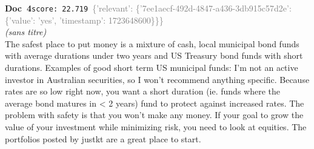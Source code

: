 \documentclass[a4paper,11pt]{article}
\begin{document}
\begin{docenv}
{\footnotesize\textcolor{doccolor}{\textbf{Doc~4}}}\hfill{\tiny\texttt{score:~22.719}}\ {\tiny\textcolor{gray}{\{'relevant': \{'7ee1aecf-492d-4847-a436-3db915c57d2e': \{'value': 'yes', 'timestamp': 1723648600\}\}\}}}\\[3pt]
{\small\textit{(sans titre)}}\\[2pt]
\vspace{2pt}
{\footnotesize 
The safest place to put money is a mixture of cash, local municipal bond funds with average durations under two years and US Treasury bond funds with short durations.  Examples of good short term US municipal funds: I'm not an active investor in Australian securities, so I won't recommend anything specific. Because rates are so low right now, you want a short duration (ie. funds where the average bond matures in < 2 years) fund to protect against increased rates. The problem with safety is that you won't make any money. If your goal to grow the value of your investment while minimizing risk, you need to look at equities. The portfolios posted by justkt are a great place to start.}
\end{docenv}
\end{document}
